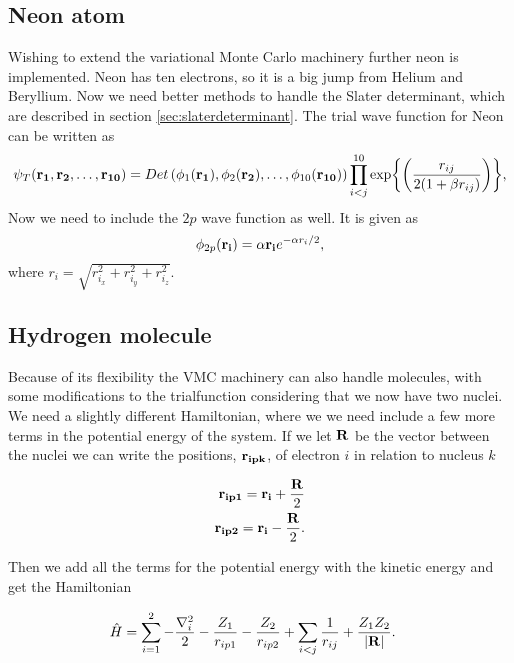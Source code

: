 	\subsection{Neon atom}

		Wishing to extend the variational Monte Carlo machinery further neon is implemented. Neon has ten electrons, so it is a big jump from Helium and Beryllium. Now we need better methods to handle the Slater determinant, which are described in section \ref{sec:slaterdeterminant}. The trial wave function for Neon can be written as
		\begin{equation}
		   \psi_{T}({\bf r_1},{\bf r_2}, \dots,{\bf r_{10}}) =
		   Det\left(\phi_{1}({\bf r_1}),\phi_{2}({\bf r_2}),
		   \dots,\phi_{10}({\bf r_{10}})\right)
		   \prod_{i<j}^{10}\exp{\left(\frac{r_{ij}}{2(1+\beta r_{ij})}\right)},
		   \label{eq:NeonTrialFunction}
		\end{equation}
		Now we need to include the $2p$ wave function as well. It is given as
		\begin{equation}
			\phi_{2p}({\bf r_i}) = \alpha {\bf r_i}e^{-\alpha r_i/2},
		\end{equation}
		where $ {r_i} = \sqrt{r_{i_x}^2+r_{i_y}^2+r_{i_z}^2}$.



	\subsection{Hydrogen molecule}
		\label{sec:H2}
		Because of its flexibility the VMC machinery can also
                handle molecules, with some modifications to the
                trialfunction considering that we now have two
                nuclei. We need a slightly different Hamiltonian,
                where we we need include a few more terms in the
                potential energy of the system. If we let \(\vb{R}\)
                be the vector between the nuclei we can write the
                positions, \(\vb{r_{ipk}}\), of electron \(i\) in
                relation to nucleus \(k\)

		\begin{align}
			\vb{r_{ip1}} = \vb{r_i} + \frac{\vb{R}}{2}
			\\
			\vb{r_{ip2}} = \vb{r_i} - \frac{\vb{R}}{2}.
		\end{align}

		Then we add all the terms for the potential energy with the kinetic energy and get the Hamiltonian

		\begin{align}
			\hat{H} &= \sum_{i = 1}^2 - \frac{\nabla^2_i}{2} - \frac{Z_1}{r_{ip1}} - \frac{Z_2}{r_{ip2}} + \sum_{i < j}\frac{1}{r_{ij}} + \frac{Z_1Z_2}{|\vb{R|}}. \label{eq:hamiltonianMolecule}
		\end{align}

